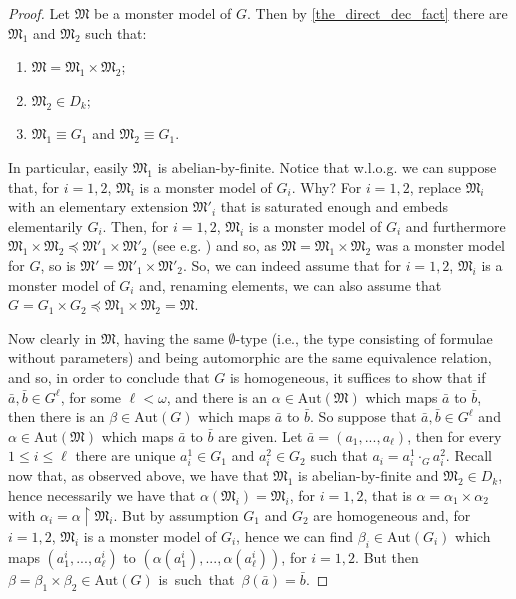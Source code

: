\documentclass[a4paper, 11pt]{amsart}
\theoremstyle{definition}
\theoremstyle{remark}
\renewcommand{\leq}{\leqslant}
\begin{document}
	\begin{proof} Let $\mathfrak{M}$ be a monster model of $G$. Then by \ref{the_direct_dec_fact} there are $\mathfrak{M}_1$ and $\mathfrak{M}_2$ such that:
	\begin{enumerate}[(1)]
	\item $\mathfrak{M} = \mathfrak{M}_1 \times \mathfrak{M}_2$;
	\item $\mathfrak{M}_2 \in D_k$;
	\item $\mathfrak{M}_1 \equiv G_1$ and $\mathfrak{M}_2 \equiv G_1$. 
\end{enumerate}	
In particular, easily $\mathfrak{M}_1$ is abelian-by-finite. Notice that w.l.o.g. we can suppose that, for $i = 1, 2$, $\mathfrak{M}_i$ is a monster model of $G_i$. Why? For $i = 1, 2$, replace $\mathfrak{M}_i$ with an elementary extension $\mathfrak{M}'_i$ that is saturated enough and embeds elementarily $G_i$. Then, for $i = 1, 2$, $\mathfrak{M}_i$ is a monster model of $G_i$ and furthermore $\mathfrak{M}_1 \times \mathfrak{M}_2 \preccurlyeq \mathfrak{M}'_1 \times \mathfrak{M}'_2$ (see e.g. \cite[Section~3.3, Exercise~7]{hodges}) and so, as $\mathfrak{M} = \mathfrak{M}_1 \times \mathfrak{M}_2$ was a monster model for $G$, so is $\mathfrak{M}' = \mathfrak{M}'_1 \times \mathfrak{M}'_2$. So, we can indeed assume that for $i = 1, 2$, $\mathfrak{M}_i$ is a monster model of $G_i$ and, renaming elements, we can also assume that $G = G_1 \times G_2 \preccurlyeq \mathfrak{M}_1 \times \mathfrak{M}_2 = \mathfrak{M}$.

\smallskip \noindent
Now clearly in $\mathfrak{M}$, having the same $\emptyset$-type (i.e., the type consisting of formulae without parameters) and being automorphic are the same equivalence relation, and so, in order to conclude that $G$ is homogeneous, it suffices to show that if $\bar{a}, \bar{b} \in G^\ell$, for some $\ell < \omega$, and there is an $\alpha \in \mathrm{Aut}(\mathfrak{M})$ which maps $\bar{a}$ to $\bar{b}$, then there is an $\beta \in \mathrm{Aut}(G)$ which maps $\bar{a}$ to $\bar{b}$. So suppose that $\bar{a}, \bar{b} \in G^\ell$ and $\alpha \in \mathrm{Aut}(\mathfrak{M})$ which maps $\bar{a}$ to $\bar{b}$ are given. Let $\bar{a} = (a_1, ..., a_\ell)$, then for every $1 \leq i \leq \ell$ there are unique $a^1_i \in G_1$ and $a^2_i \in G_2$ such that $a_i = a^1_i \cdot_G a^2_i$. Recall now that, as observed above, we have that $\mathfrak{M}_1$ is abelian-by-finite and $\mathfrak{M}_2 \in D_k$, hence necessarily we have that $\alpha(\mathfrak{M}_i) = \mathfrak{M}_i$, for $i = 1, 2$, that is $\alpha = \alpha_1 \times \alpha_2$ with $\alpha_i = \alpha \restriction \mathfrak{M}_i$. But by assumption $G_1$ and $G_2$ are homogeneous and, for $i = 1, 2$, $\mathfrak{M}_i$ is a monster model of $G_i$, hence we can find $\beta_i \in \mathrm{Aut}(G_i)$ which maps $(a^i_1, ..., a^i_\ell)$ to $(\alpha(a^i_1), ..., \alpha(a^i_\ell))$, for $i = 1, 2$. But then $\beta = \beta_1 \times \beta_2 \in \mathrm{Aut}(G)$ \mbox{is such that $\beta(\bar{a}) = \bar{b}$.}
	\end{proof}
	
\end{document}
